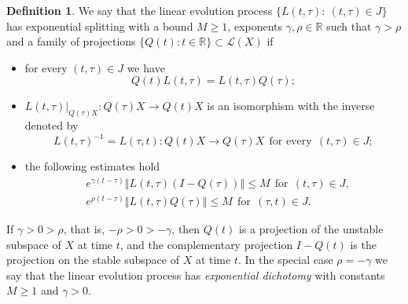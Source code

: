 \documentclass[a4paper,11pt,reqno]{amsart}
\theoremstyle{plain}
\theoremstyle{definition}
\newtheorem{defn}[lem]{Definition}
\numberwithin{equation}{section}
\newcommand{\R}{\mathbb{R}}
\newcommand{\norm}[1]{\left\Vert#1\right\Vert}
\renewcommand{\geq}{\geqslant}
\renewcommand{\leq}{\leqslant}
\begin{document}
\begin{defn}\label{def:splitting}
	We say that the linear evolution process $\{L(t,\tau)\colon \ (t,\tau)\in J\}$ has exponential splitting with a bound $M\geq 1$,  exponents $\gamma,\rho\in\R$ such that $\gamma>\rho$ and a family of projections $\{Q(t)\colon t\in\R\}\subset\mathcal{L}(X)$ if
	\begin{itemize}
		\item[(i)] for every $(t,\tau)\in J$ we have \begin{equation*}
			Q(t)L(t,\tau)=L(t,\tau)Q(\tau);
		\end{equation*}
		\item[(ii)] $L(t,\tau)|_{Q(\tau)X}\colon Q(\tau)X\to Q(t)X$  is an isomorphism with the inverse denoted by $$L(t,\tau)^{-1} = L(\tau,t)\colon Q(t)X\to Q(\tau)X\ \ \text{for every}\ \ (t,\tau)\in J;$$
		\item[(iii)] the following  estimates hold
		\begin{align}\label{e:QTST}
			& e^{\gamma(t-\tau)}\norm{L(t,\tau)(I-Q(\tau))}\leq M\ \ \text{for}\ \  (t,\tau)\in J,\\
		\label{e:QTUNST}
		&	e^{\rho(t-\tau)}\norm{L(t,\tau)Q(\tau)}\leq M\ \ \text{for}\ \  (\tau,t) \in J.
	\end{align}		 
	\end{itemize}
\end{defn}


If $\gamma>0>\rho$, that is, $-\rho>0>-\gamma$, then $Q(t)$ is a projection of the unstable
subspace of $X$ at time $t$, and the complementary projection
 $I-Q(t)$ is the projection on the stable subspace of $X$ at time $t$. In the special case $\rho = -\gamma$ we say that the linear evolution process has \textit{exponential dichotomy} with constants $M\geq 1$ and $\gamma>0$. 
 
\end{document}
